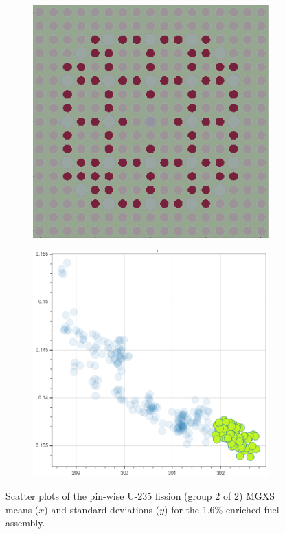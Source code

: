 \begin{figure}[h!]
\begin{subfigure}{0.42\textwidth}
  \caption{}
  \label{fig:chap10-fiss-mean-std-mgxs-2}
\end{subfigure}
\begin{subfigure}{0.42\textwidth}
  \centering
  \includegraphics[width=0.9\linewidth]{figures/unsupervised/features/assm-16/u235-fiss/mean-std/geometry-3}
  \caption{}
  \label{fig:chap10-fiss-mean-std-geom-3}
\end{subfigure}%
\begin{subfigure}{0.42\textwidth}
  \centering
  \includegraphics[width=0.9\linewidth]{figures/unsupervised/features/assm-16/u235-fiss/mean-std/mgxs-3}
  \caption{}
  \label{fig:chap10-fiss-mean-std-mgxs-3}
\end{subfigure}
\caption[Clustering of U-235 fission MGXS standard deviations]{Scatter plots of the pin-wise U-235 fission (group 2 of 2) \ac{MGXS} means ($x$) and standard deviations ($y$) for the 1.6\% enriched fuel assembly.}
\label{fig:chap10-mean-std}
\end{figure}

